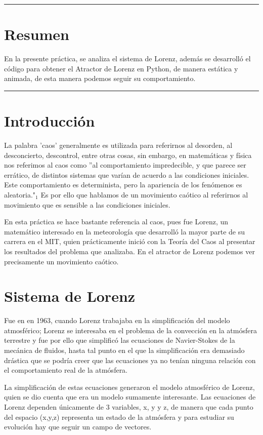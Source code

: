 \documentclass[12pt]{article}
\begin{document}
\begin{doublespace}
\hrule
\section*{Resumen}
En la presente práctica, se analiza el sistema de Lorenz, además se desarrolló el código para obtener el Atractor de Lorenz en Python, de manera estática y animada, de esta manera podemos seguir su comportamiento.
\vspace{0.6 cm}
\hrule

\vspace{0.6 cm}

\section{Introducción}

La palabra 'caos' generalmente es utilizada para referirnos al desorden, al desconcierto, descontrol, entre otras cosas, sin embargo, en matemáticas y física nos referimos al caos como ''al comportamiento impredecible, y que parece ser errático, de distintos sistemas que varían de acuerdo a las condiciones iniciales. Este comportamiento es determinista, pero la apariencia de los fenómenos es aleatoria."$_1$ Es por ello que hablamos de un movimiento caótico al referirnos al movimiento que es sensible a las condiciones iniciales. 

En esta práctica se hace bastante referencia al caos, pues fue Lorenz, un matemático interesado en la meteorología que desarrolló la mayor parte de su carrera en el MIT, quien prácticamente inició con la Teoría del Caos al presentar los resultados del problema que analizaba. En el atractor de Lorenz podemos ver precisamente un movimiento caótico.

\section{Sistema de Lorenz}
Fue en en 1963, cuando Lorenz trabajaba en la simplificación del modelo atmosférico; Lorenz se interesaba en el problema de la convección en la atmósfera terrestre y fue por ello que simplificó las ecuaciones de Navier-Stokes de la mecánica de fluidos, hasta tal punto en el que la simplificación era demasiado drástica que se podría creer que las ecuaciones ya no tenían ninguna relación con el comportamiento real de la atmósfera.

La simplificación de estas ecuaciones generaron el modelo atmosférico de Lorenz, quien se dio cuenta que era un modelo sumamente interesante. Las ecuaciones de Lorenz dependen únicamente de 3 variables, x, y y z, de manera que cada punto del espacio (x,y,z) representa un estado de la atmósfera y para estudiar su evolución hay que seguir un campo de vectores.


\end{doublespace}
\end{document}
